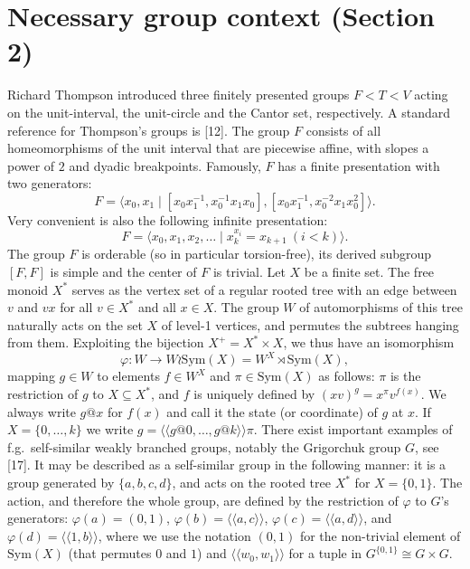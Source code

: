 \section*{Necessary group context (Section 2)}
Richard Thompson introduced three finitely presented groups $F<T<V$ acting on the unit-interval, the unit-circle and the Cantor set, respectively. A standard reference for Thompson's groups is [12]. The group $F$ consists of all homeomorphisms of the unit interval that are piecewise affine, with slopes a power of $2$ and dyadic breakpoints. Famously, $F$ has a finite presentation with two generators:
\[
F=\langle x_0,x_1\mid[x_0x_1^{-1},x_0^{-1}x_1x_0],[x_0x_1^{-1},x_0^{-2}x_1x_0^2]\rangle .
\]
Very convenient is also the following infinite presentation:
\[
F=\langle x_0,x_1,x_2,\ldots\mid x_k^{x_i}=x_{k+1}\ (i<k)\rangle .
\]
The group $F$ is orderable (so in particular torsion-free), its derived subgroup $[F,F]$ is simple and the center of $F$ is trivial.
Let $X$ be a finite set. The free monoid $X^*$ serves as the vertex set of a regular rooted tree with an edge between $v$ and $vx$ for all $v\in X^*$ and all $x\in X$. The group $W$ of automorphisms of this tree naturally acts on the set $X$ of level-1 vertices, and permutes the subtrees hanging from them. Exploiting the bijection $X^+=X^*\times X$, we thus have an isomorphism
\[
\varphi:W\to W\wr\mathrm{Sym}(X)=W^X\rtimes\mathrm{Sym}(X),
\]
mapping $g\in W$ to elements $f\in W^X$ and $\pi\in\mathrm{Sym}(X)$ as follows: $\pi$ is the restriction of $g$ to $X\subseteq X^*$, and $f$ is uniquely defined by $(xv)^g=x^\pi v^{f(x)}$. We always write $g@x$ for $f(x)$ and call it the state (or coordinate) of $g$ at $x$. If $X=\{0,\ldots,k\}$ we write $g=\langle\!\langle g@0,\ldots,g@k\rangle\!\rangle\pi$.
There exist important examples of f.g.\ self-similar weakly branched groups, notably the Grigorchuk group $G$, see [17]. It may be described as a self-similar group in the following manner: it is a group generated by $\{a,b,c,d\}$, and acts on the rooted tree $X^*$ for $X=\{0,1\}$. The action, and therefore the whole group, are defined by the restriction of $\varphi$ to $G$'s generators: $\varphi(a)=(0,1)$, $\varphi(b)=\langle\!\langle a,c\rangle\!\rangle$, $\varphi(c)=\langle\!\langle a,d\rangle\!\rangle$, and $\varphi(d)=\langle\!\langle1,b\rangle\!\rangle$, where we use the notation $(0,1)$ for the non-trivial element of $\mathrm{Sym}(X)$ (that permutes $0$ and $1$) and $\langle\!\langle w_0,w_1\rangle\!\rangle$ for a tuple in $G^{\{0,1\}}\cong G\times G$.

